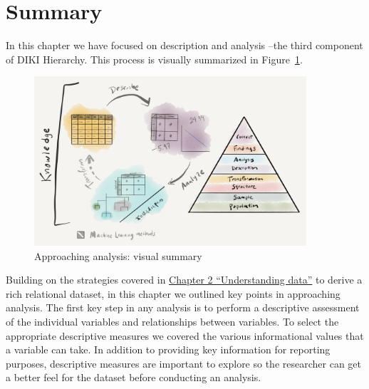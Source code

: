 \documentclass[
  letterpaper,
]{latex/krantz}
\begin{document}
\hypertarget{summary-3}{%
\section*{Summary}\label{summary-3}}


In this chapter we have focused on description and analysis --the third
component of DIKI Hierarchy. This process is visually summarized in
Figure~\ref{fig-approaching-analysis-visual-summary-graphic}.

\begin{figure}[h]

{\centering \includegraphics[width=0.9\textwidth,height=\textheight]{./figures/approaching-analysis/approaching-analysis-visual-summary-paper.png}

}

\caption{\label{fig-approaching-analysis-visual-summary-graphic}Approaching
analysis: visual summary}

\end{figure}

Building on the strategies covered in
\protect\hyperlink{sec-understanding-data}{Chapter 2 ``Understanding
data''} to derive a rich relational dataset, in this chapter we outlined
key points in approaching analysis. The first key step in any analysis
is to perform a descriptive assessment of the individual variables and
relationships between variables. To select the appropriate descriptive
measures we covered the various informational values that a variable can
take. In addition to providing key information for reporting purposes,
descriptive measures are important to explore so the researcher can get
a better feel for the dataset before conducting an analysis.
\end{document}
